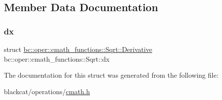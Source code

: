 \subsection{Member Data Documentation}
\mbox{\label{structbc_1_1oper_1_1cmath__functions_1_1Sqrt_a3bd63de2e9549ccacf912e1008ed83f0}} 
\subsubsection{\texorpdfstring{dx}{dx}}
{\footnotesize\ttfamily struct \hyperlink{structbc_1_1oper_1_1cmath__functions_1_1Sqrt_1_1Derivative}{bc\+::oper\+::cmath\+\_\+functions\+::\+Sqrt\+::\+Derivative}   bc\+::oper\+::cmath\+\_\+functions\+::\+Sqrt\+::dx}



The documentation for this struct was generated from the following file\+:\begin{DoxyCompactItemize}
\item 
blackcat/operations/\hyperlink{cmath_8h}{cmath.\+h}\end{DoxyCompactItemize}
